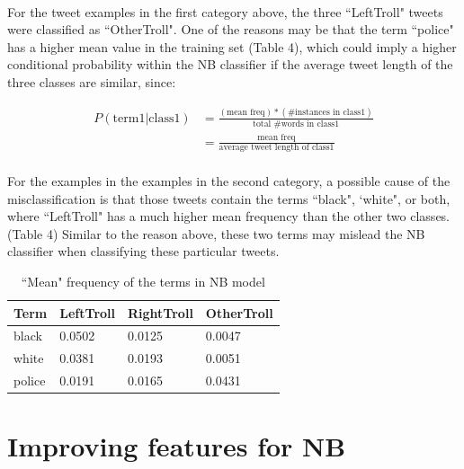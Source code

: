 \documentclass[11pt]{article}
\begin{document}
\paragraph{} For the tweet examples in the first category above, the three ``LeftTroll" tweets were classified as ``OtherTroll". One of the reasons may be that the term ``police" has a higher mean value in the training set (Table 4), which could imply a higher conditional probability within the NB classifier if the average tweet length of the three classes are similar, since:

\begin{equation*}
\begin{split} 
P(\text{term1} | \text{class1}) &= \frac{(\text{mean freq}) * (\text{\# instances in class1})}{\text{total \# words in class1}} \\
& = \frac{\text{mean freq}}{\text{average tweet length of class1}}
\end{split}
\end{equation*}

\paragraph{} For the examples in the examples in the second category, a possible cause of the misclassification is that those tweets contain the terms ``black", `white", or both, where ``LeftTroll" has a much higher mean frequency than the other two classes. (Table 4) Similar to the reason above, these two terms may mislead the NB classifier when classifying these particular tweets.

\begin{table}[!htbp]
 \begin{center}
\begin{tabular}{| l | l | l | l |}
      \hline
      Term & LeftTroll & RightTroll & OtherTroll \\
      \hline\hline
      black & 0.0502 & 0.0125 & 0.0047 \\
      white & 0.0381 & 0.0193 & 0.0051 \\
      police & 0.0191 & 0.0165 & 0.0431 \\
      \hline
\end{tabular}
\caption{``Mean" frequency of the terms in NB model}\label{table2}
 \end{center}
\end{table}


\section{Improving features for NB}
\end{document}
